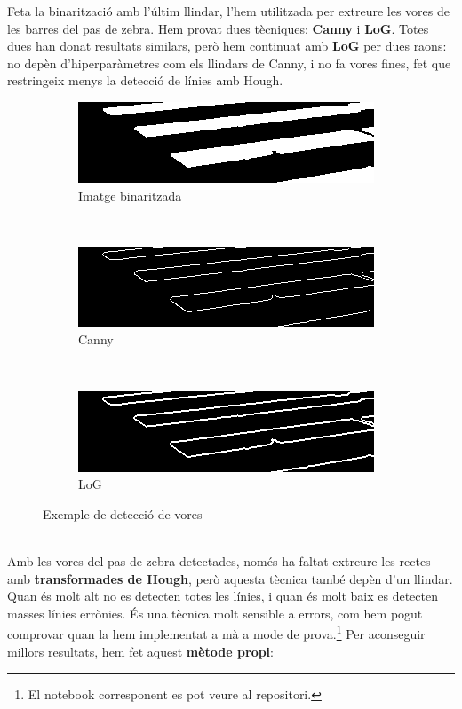 \documentclass[10pt,a4paper,twocolumn,twoside]{article}
\begin{document}
Feta la binarització amb l’últim llindar, l’hem utilitzada per extreure les vores de les barres del pas de zebra. Hem provat dues tècniques: \textbf{Canny} i \textbf{LoG}. Totes dues han donat resultats similars, però hem continuat amb \textbf{LoG} per dues raons: no depèn d’hiperparàmetres com els llindars de Canny, i no fa vores fines, fet que restringeix menys la detecció de línies amb Hough.
\vspace{5pt}
\begin{figure}[h]
	\centering
	\begin{subfigure}{0.31\columnwidth}
		\includegraphics[width=\linewidth]{figs/mog}
		\caption{Imatge binaritzada}
	\end{subfigure}
	\ 
	\begin{subfigure}{0.31\columnwidth}
		\includegraphics[width=\linewidth]{figs/canny}
		\caption{Canny}
	\end{subfigure}
	\ 
	\begin{subfigure}{0.31\columnwidth}
		\includegraphics[width=\linewidth]{figs/log}
		\caption{LoG}
	\end{subfigure}
	\caption{Exemple de detecció de vores}
	\label{fig:hough}
\end{figure}
\\
Amb les vores del pas de zebra detectades, només ha faltat extreure les rectes amb \textbf{transformades de Hough}, però aquesta tècnica també depèn d'un llindar. Quan és molt alt no es detecten totes les línies, i quan és molt baix es detecten masses línies errònies. És una tècnica molt sensible a errors, com hem pogut comprovar quan la hem implementat a mà a mode de prova.\footnote{El notebook corresponent es pot veure al repositori.} Per aconseguir millors resultats, hem fet aquest \textbf{mètode propi}:
\end{document}
